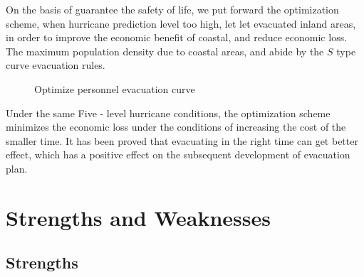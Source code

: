 \documentclass{mcmthesis}
\begin{document}
On the basis of guarantee the safety of life, we put forward the optimization scheme, when hurricane prediction level too high, let let evacuated inland areas, in order to improve the economic benefit of coastal, and reduce economic loss. The maximum population density due to coastal areas, and abide by the $S$ type curve evacuation rules.

\begin{figure}[h]
  \caption{Optimize personnel evacuation curve}\label{figure5}
\end{figure}

Under the same Five - level hurricane conditions, the optimization scheme minimizes the economic loss under the conditions of increasing the cost of the smaller time. It has been proved that evacuating in the right time can get better effect, which has a positive effect on the subsequent development of evacuation plan.

\section{Strengths and Weaknesses}

\subsection{Strengths}
\end{document}
